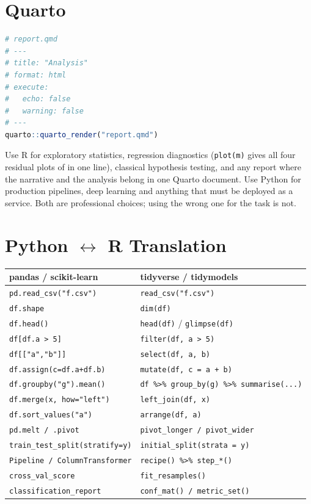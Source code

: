 \section{Quarto}

\begin{lstlisting}[language=R]
# report.qmd
# ---
# title: "Analysis"
# format: html
# execute:
#   echo: false
#   warning: false
# ---
quarto::quarto_render("report.qmd")
\end{lstlisting}

\begin{conceptbox}
Use R for exploratory statistics, regression diagnostics (\texttt{plot(m)} gives
all four residual plots of  in one line), classical hypothesis
testing, and any report where the narrative and the analysis belong in one Quarto
document. Use Python for production pipelines, deep learning and anything that must
be deployed as a service. Both are professional choices; using the wrong one for
the task is not.
\end{conceptbox}

\section{\texorpdfstring{Python $\leftrightarrow$ R Translation}{Python <-> R Translation}}

\begin{longtable}{@{}L{6.6cm}L{7.4cm}@{}}
\toprule
{}
\textbf{pandas / scikit-learn} & \textbf{tidyverse / tidymodels} \\
\midrule
\endhead
\texttt{pd.read\_csv("f.csv")} & \texttt{read\_csv("f.csv")} \\
\texttt{df.shape} & \texttt{dim(df)} \\
\texttt{df.head()} & \texttt{head(df)} / \texttt{glimpse(df)} \\
\texttt{df[df.a > 5]} & \texttt{filter(df, a > 5)} \\
\texttt{df[["a","b"]]} & \texttt{select(df, a, b)} \\
\texttt{df.assign(c=df.a+df.b)} & \texttt{mutate(df, c = a + b)} \\
\texttt{df.groupby("g").mean()} & \texttt{df \%>\% group\_by(g) \%>\% summarise(...)} \\
\texttt{df.merge(x, how="left")} & \texttt{left\_join(df, x)} \\
\texttt{df.sort\_values("a")} & \texttt{arrange(df, a)} \\
\texttt{pd.melt / .pivot} & \texttt{pivot\_longer / pivot\_wider} \\
\texttt{train\_test\_split(stratify=y)} & \texttt{initial\_split(strata = y)} \\
\texttt{Pipeline / ColumnTransformer} & \texttt{recipe() \%>\% step\_*()} \\
\texttt{cross\_val\_score} & \texttt{fit\_resamples()} \\
\texttt{classification\_report} & \texttt{conf\_mat() / metric\_set()} \\
\bottomrule
\end{longtable}
